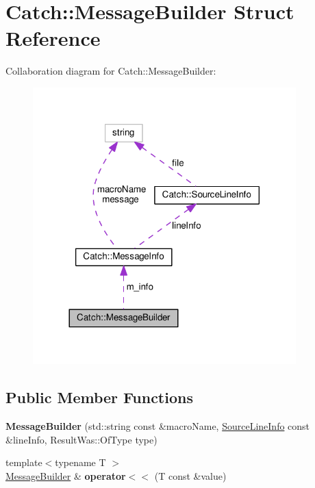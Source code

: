 \hypertarget{structCatch_1_1MessageBuilder}{}\section{Catch\+:\+:Message\+Builder Struct Reference}
\label{structCatch_1_1MessageBuilder}


Collaboration diagram for Catch\+:\+:Message\+Builder\+:
\nopagebreak
\begin{figure}[H]
\begin{center}
\leavevmode
\includegraphics[width=288pt]{structCatch_1_1MessageBuilder__coll__graph}
\end{center}
\end{figure}
\subsection*{Public Member Functions}
\begin{DoxyCompactItemize}
\item 
{\bfseries Message\+Builder} (std\+::string const \&macro\+Name, \hyperlink{structCatch_1_1SourceLineInfo}{Source\+Line\+Info} const \&line\+Info, Result\+Was\+::\+Of\+Type type)\hypertarget{structCatch_1_1MessageBuilder_ab0c6378e722680bf58852c6ee2b6e724}{}\label{structCatch_1_1MessageBuilder_ab0c6378e722680bf58852c6ee2b6e724}

\item 
{\footnotesize template$<$typename T $>$ }\\\hyperlink{structCatch_1_1MessageBuilder}{Message\+Builder} \& {\bfseries operator$<$$<$} (T const \&value)\hypertarget{structCatch_1_1MessageBuilder_a20fa48d069b20dddcc2d3df8abb123c1}{}\label{structCatch_1_1MessageBuilder_a20fa48d069b20dddcc2d3df8abb123c1}

\end{DoxyCompactItemize}
